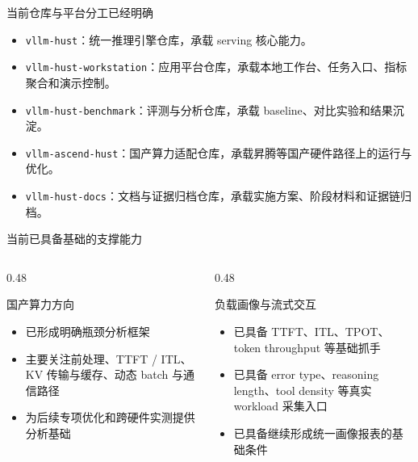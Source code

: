 \documentclass[aspectratio=169,11pt]{ctexbeamer}
\begin{document}
\begin{frame}{当前仓库与平台分工已经明确}
  \begin{itemize}
    \item \texttt{vllm-hust}：统一推理引擎仓库，承载 serving 核心能力。
    \item \texttt{vllm-hust-workstation}：应用平台仓库，承载本地工作台、任务入口、指标聚合和演示控制。
    \item \texttt{vllm-hust-benchmark}：评测与分析仓库，承载 baseline、对比实验和结果沉淀。
    \item \texttt{vllm-ascend-hust}：国产算力适配仓库，承载昇腾等国产硬件路径上的运行与优化。
    \item \texttt{vllm-hust-docs}：文档与证据归档仓库，承载实施方案、阶段材料和证据链归档。
  \end{itemize}
\end{frame}

\begin{frame}{当前已具备基础的支撑能力}
  \begin{columns}[T]
    \begin{column}{0.48\textwidth}
      \begin{block}{国产算力方向}
        \begin{itemize}
          \item 已形成明确瓶颈分析框架
          \item 主要关注前处理、TTFT / ITL、KV 传输与缓存、动态 batch 与通信路径
          \item 为后续专项优化和跨硬件实测提供分析基础
        \end{itemize}
      \end{block}
    \end{column}
    \begin{column}{0.48\textwidth}
      \begin{block}{负载画像与流式交互}
        \begin{itemize}
          \item 已具备 TTFT、ITL、TPOT、token throughput 等基础抓手
          \item 已具备 error type、reasoning length、tool density 等真实 workload 采集入口
          \item 已具备继续形成统一画像报表的基础条件
        \end{itemize}
      \end{block}
    \end{column}
  \end{columns}
\end{frame}
\end{document}
